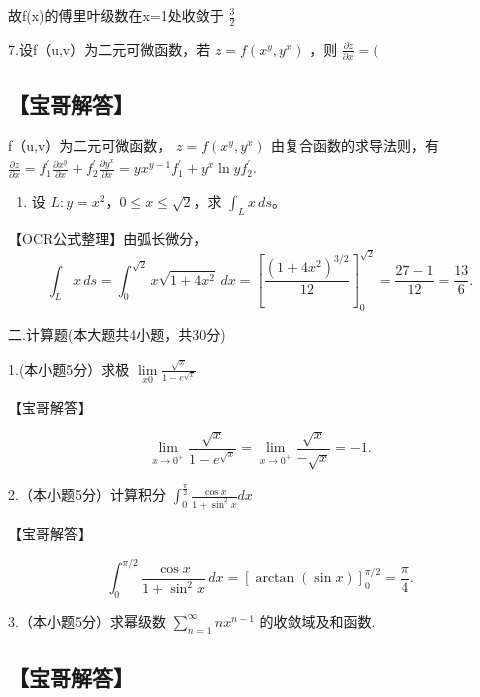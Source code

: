 \documentclass[11pt,fontset=fandol]{ctexart}
\providecommand{\tightlist}{\setlength{\itemsep}{0pt}\setlength{\parskip}{0pt}}
\begin{document}
故f(x)的傅里叶级数在x=1处收敛于 \(\frac { 3 } { 2 }\)

7.设f（u,v）为二元可微函数，若 \(z = f ( x ^ { y } , y ^ { x } )\) ，则
\(\frac { \partial z } { \partial x } = (\)

\subsection{【宝哥解答】}\label{ux5b9dux54e5ux89e3ux7b54-1}

f（u,v）为二元可微函数， \(z = f ( x ^ { y } , y ^ { x } ) _ {  }\)
由复合函数的求导法则，有\(\frac { \partial z } { \partial x } = f _ { 1 } ^ { \prime } \frac { \partial x ^ { y } } { \partial x } + f _ { 2 } ^ { \prime } \frac { \partial y ^ { x } } { \partial x } = y x ^ { y - 1 } f _ { 1 } ^ { \prime } + y ^ { x } \ln y f _ { 2 } ^ { \prime } .\)

\begin{enumerate}
\def\labelenumi{\arabic{enumi}.}
\setcounter{enumi}{7}
\tightlist
\item
  设 \(L:y=x^2\)，\(0\le x\le\sqrt2\)，求 \(\int_Lx\,ds\)。
\end{enumerate}

【OCR公式整理】由弧长微分， \[
\int_Lx\,ds=\int_0^{\sqrt2}x\sqrt{1+4x^2}\,dx
=\left[\frac{(1+4x^2)^{3/2}}{12}\right]_0^{\sqrt2}
=\frac{27-1}{12}=\frac{13}{6}.
\]

二.计算题(本大题共4小题，共30分)

1.(本小题5分）求极
\(\lim \limits _ { x  0 } \frac { \sqrt { x } } { 1 - e ^ { \sqrt { x } } }\)

【宝哥解答】

\[
\lim _ { x \to 0 ^ { + } } { \frac { \sqrt { x } } { 1 - e ^ { \sqrt { x } } } } = \lim _ { x \to 0 ^ { + } } { \frac { \sqrt { x } } { - { \sqrt { x } } } } = - 1 .
\]

2.（本小题5分）计算积分
\(\int _ { 0 } ^ { \frac { \pi } { 2 } } \frac { \cos x } { 1 + \sin ^ { 2 } x } d x\)

【宝哥解答】

\[
\int_0^{\pi/2}\frac{\cos x}{1+\sin^2x}\,dx
=\left[\arctan(\sin x)\right]_0^{\pi/2}=\frac\pi4.
\]

3.（本小题5分）求幂级数
\(\sum _ { n = 1 } ^ { \infty } n x ^ { n - 1 }\) 的收敛域及和函数.

\subsection{【宝哥解答】}\label{ux5b9dux54e5ux89e3ux7b54-2}
\end{document}
